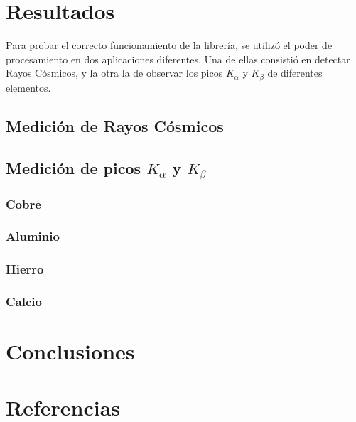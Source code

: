 \documentclass[twoside,twocolumn]{article}
\begin{document}

  \section{Resultados}
    Para probar el correcto funcionamiento de la librería, se utilizó el poder de procesamiento en dos aplicaciones diferentes.
    Una de ellas consistió en detectar Rayos Cósmicos, y la otra la de observar los picos $K_{\alpha}$ y $K_{\beta}$ de diferentes elementos.
    
    \subsection{Medición de Rayos Cósmicos}

    \subsection{Medición de picos $K_{\alpha}$ y $K_{\beta}$}

      \subsubsection{Cobre}

      \subsubsection{Aluminio}

      \subsubsection{Hierro}

      \subsubsection{Calcio}
    
  \section{Conclusiones}
  \section{Referencias}\label{}
    
\end{document}
